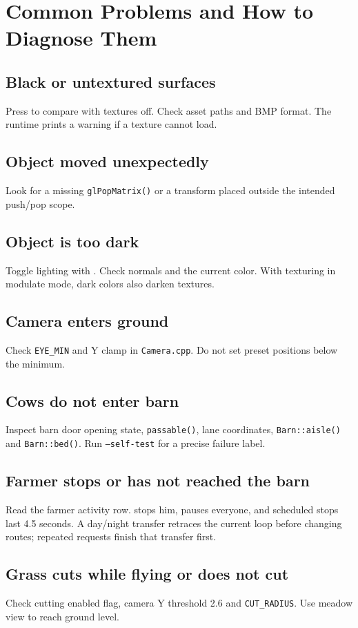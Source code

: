 \documentclass[11pt,a4paper,openany]{book}
\newcommand{\code}[1]{\texttt{#1}}
\newcommand{\file}[1]{\nolinkurl{#1}}
\newcommand{\keycap}[1]{\begingroup\setlength{\fboxsep}{0.8pt}\raisebox{0.05ex}{\fbox{\footnotesize\texttt{#1}}}\endgroup}
\begin{document}
\chapter{Common Problems and How to Diagnose Them}
\section{Black or untextured surfaces}
Press \keycap{T} to compare with textures off. Check asset paths and BMP format. The runtime prints a warning if a texture cannot load.

\section{Object moved unexpectedly}
Look for a missing \code{glPopMatrix()} or a transform placed outside the intended push/pop scope.

\section{Object is too dark}
Toggle lighting with \keycap{L}. Check normals and the current color. With texturing in modulate mode, dark colors also darken textures.

\section{Camera enters ground}
Check \code{EYE_MIN} and Y clamp in \file{Camera.cpp}. Do not set preset positions below the minimum.

\section{Cows do not enter barn}
Inspect barn door opening state, \code{passable()}, lane coordinates, \code{Barn::aisle()} and \code{Barn::bed()}. Run \code{--self-test} for a precise failure label.

\section{Farmer stops or has not reached the barn}
Read the farmer activity row. \keycap{U} stops him, \keycap{P} pauses everyone, and scheduled stops last 4.5 seconds. A day/night transfer retraces the current loop before changing routes; repeated requests finish that transfer first.

\section{Grass cuts while flying or does not cut}
Check cutting enabled flag, camera Y threshold 2.6 and \code{CUT_RADIUS}. Use meadow view \keycap{G} to reach ground level.
\end{document}
